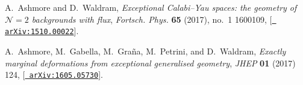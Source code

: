 \documentclass{PoS}
\begin{document}
\begin{thebibliography}{99}
A.~Ashmore and D.~Waldram, {\it {Exceptional Calabi--Yau spaces: the geometry
  of $\mathcal{N}=2$ backgrounds with flux}},  {\em Fortsch. Phys.} {\bf 65}
  (2017), no.~1 1600109, [\href{http://arxiv.org/abs/1510.00022}{{\tt
  arXiv:1510.00022}}].

A.~Ashmore, M.~Gabella, M.~Gra{\~n}a, M.~Petrini, and D.~Waldram, {\it {Exactly
  marginal deformations from exceptional generalised geometry}},  {\em JHEP}
  {\bf 01} (2017) 124, [\href{http://arxiv.org/abs/1605.05730}{{\tt
  arXiv:1605.05730}}].
\end{thebibliography}
\end{document}
